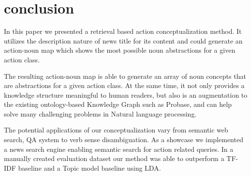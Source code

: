 \section{conclusion}

In this paper we presented a retrieval based action conceptualization method.
It utilizes the description nature of news title for its content and could generate an
action-noun map which shows the most possible noun abstractions for a given action class.

The resulting action-noun map is able to generate an array of noun concepts that are abstractions for
a given action class. At the same time, it not only provides a knowledge structure meaningful to human readers,
but also is an augmentation to the existing ontology-based Knowledge Graph such as Probase, and can help solve many
challenging problems in Natural language processing.

The potential applications of our conceptualization vary from semantic web search, QA system to
verb sense disambiguation. As a showcase we implemented a news search engine enabling semantic search for
action related queries. In a manually created evaluation dataset our method was able to outperform a TF-IDF
baseline and a Topic model baseline using LDA.
